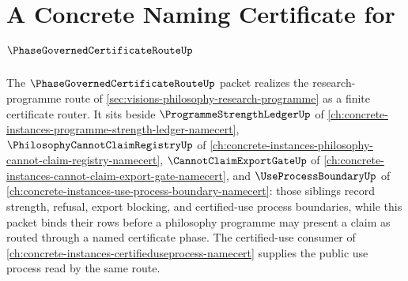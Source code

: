 \chapter{A Concrete Naming Certificate for $\PhaseGovernedCertificateRouteUp$}
\label{ch:concrete-instances-phasegovernedcertificateroute-namecert}

The $\PhaseGovernedCertificateRouteUp$ packet realizes the research-programme route of \autoref{sec:visions-philosophy-research-programme} as a finite certificate router. It sits beside $\ProgrammeStrengthLedgerUp$ of \autoref{ch:concrete-instances-programme-strength-ledger-namecert}, $\PhilosophyCannotClaimRegistryUp$ of \autoref{ch:concrete-instances-philosophy-cannot-claim-registry-namecert}, $\CannotClaimExportGateUp$ of \autoref{ch:concrete-instances-cannot-claim-export-gate-namecert}, and $\UseProcessBoundaryUp$ of \autoref{ch:concrete-instances-use-process-boundary-namecert}: those siblings record strength, refusal, export blocking, and certified-use process boundaries, while this packet binds their rows before a philosophy programme may present a claim as routed through a named certificate phase. The certified-use consumer of \autoref{ch:concrete-instances-certifieduseprocess-namecert} supplies the public use process read by the same route.

